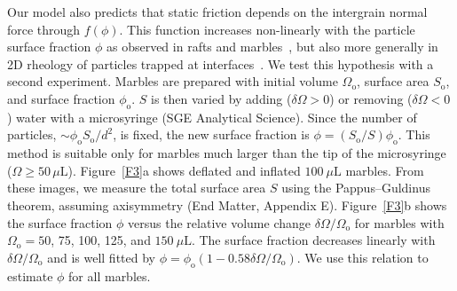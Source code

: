 \documentclass[twocolumn, prl,
 amsmath,amssymb,
 superscriptaddress,aps,
]{revtex4-2}
\begin{document}
Our model also predicts that static friction depends on the intergrain normal force through $f(\phi)$. 
This function increases non-linearly with the particle surface fraction $\phi$ as observed in rafts and marbles~\cite{cicuta2009granular,varshney2012amorphous,lagubeau2014armoring}, but also more generally in 2D rheology of particles trapped at interfaces~\cite{cicuta2003shearing, madivala2009self,kato2023surface}. 
We test this hypothesis with a second experiment. Marbles are prepared with initial volume $\Omega_\mathrm{o}$, surface area $S_\mathrm{o}$, and surface fraction $\phi_\mathrm{o}$. $S$ is then varied by adding ($\delta\Omega>0$) or removing ($\delta\Omega<0$) water with a microsyringe (SGE Analytical Science). Since the number of particles, $\sim\phi_\mathrm{o}S_\mathrm{o}/d^2$, is fixed, the new surface fraction is $\phi=(S_\mathrm{o}/S)\phi_\mathrm{o}$.
This method is suitable only for marbles much larger than the tip of the microsyringe ($\Omega\geq50\,\mu\mathrm{L}$).
Figure~\ref{F3}a shows deflated and inflated $100~\mu\mathrm{L}$ marbles. From these images, we measure the total surface area $S$ using the Pappus--Guldinus theorem, assuming axisymmetry (End Matter, Appendix E). Figure~\ref{F3}b shows the surface fraction $\phi$ versus the relative volume change $\delta\Omega/\Omega_\mathrm{o}$ for marbles with $\Omega_\mathrm{o}=50$, 75, 100, 125, and $150~\mu\mathrm{L}$. The surface fraction decreases linearly with $\delta\Omega/\Omega_\mathrm{o}$ and is well fitted by $\phi=\phi_\mathrm{o}(1-0.58\delta\Omega/\Omega_\mathrm{o})$. We use this relation to estimate $\phi$ for all marbles.
\end{document}
